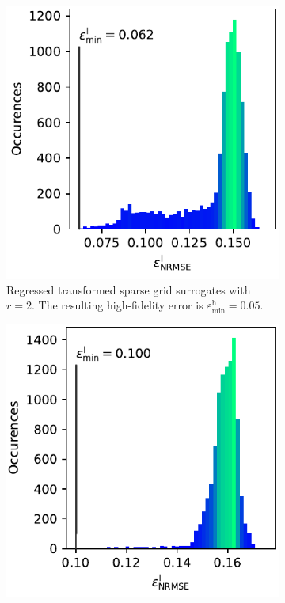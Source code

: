 \documentclass[
  a4paper,  %
  twoside,  %
  bibliography=totoc,
  headsepline,
  cleardoublepage=empty,
  parskip=half,
  draft=false
]{scrbook}
\begin{document}
\begin{mdframed}[style=style]
\begin{figure}[H]
\begin{subfigure}[H]{.5\textwidth}
\vspace{3mm}
  \label{fig:ishigami_hist_3}
\end{subfigure}\vspace{4mm}
\begin{subfigure}{.5\textwidth}
  \centering
   \includegraphics[width=0.95\linewidth]{graphics/ishigami_hist_2}
  \caption{Regressed transformed sparse grid surrogates with $r=2$. The resulting high-fidelity error is $\varepsilon^\mathrm{h}_{\mathrm{min}}=0.05$.}
\vspace{3mm}
\label{fig:ishigami_hist_2}
\end{subfigure}%
\begin{subfigure}{.5\textwidth}
  \centering
   \includegraphics[width=0.95\linewidth]{graphics/ishigami_hist_1}

\end{subfigure}
\end{figure}
\end{mdframed}
\end{document}
